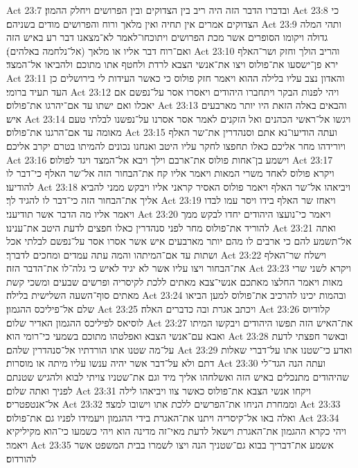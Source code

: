 Act 23:7  ובדברו הדבר הזה היה ריב בין הצדוקים ובין הפרושים ויחלק ההמון׃
Act 23:8  כי הצדוקים אמרים אין תחיה ואין מלאך ורוח והפרושים מודים בשניהם׃
Act 23:9  ותהי המלה גדולה ויקומו הסופרים אשר מכת הפרושים ויתוכחו־לאמר לא־מצאנו דבר רע באיש הזה ואם־רוח דבר אליו או מלאך (אל־נלחמה באלהים)׃
Act 23:10  והריב הולך וחזק ושר־האלף ירא פן־ישסעו את־פולוס ויצו את־אנשי הצבא לרדת ולחטף אתו מתוכם ולהביאו אל־המצד׃
Act 23:11  והאדון נצב עליו בלילה ההוא ויאמר חזק פולוס כי כאשר העידות לי בירושלים כן העד תעיד ברומי׃
Act 23:12  ויהי לפנות הבקר ויתחברו היהודים ויאסרו אסר על־נפשם אם יאכלו ואם ישתו עד אם־יהרגו את־פולוס׃
Act 23:13  והבאים באלה הזאת היו יותר מארבעים איש׃
Act 23:14  ויגשו אל־ראשי הכהנים ואל הזקנים לאמר אסר אסרנו על־נפשנו לבלתי טעם מאומה עד אם־הרגנו את־פולוס׃
Act 23:15  ועתה הודיעו־נא אתם וסנהדרין את־שר האלף ויורידהו מחר אליכם כאלו תחפצו לחקר עליו היטב ואנחנו נכונים להמיתו בטרם יקרב אליכם׃
Act 23:16  וישמע בן־אחות פולוס את־ארבם וילך ויבא אל־המצד ויגד לפולוס׃
Act 23:17  ויקרא פולוס לאחד משרי המאות ויאמר אליו קח את־הבחור הזה אל־שר האלף כי־דבר לו להודיעו׃
Act 23:18  ויביאהו אל־שר האלף ויאמר פולוס האסיר קראני אליו ויבקש ממני להביא אליך את־הבחור הזה כי־דבר לו להגיד לך׃
Act 23:19  ויאחז שר האלף בידו ויסר עמו לבדו ויאמר אליו מה הדבר אשר תודיעני׃
Act 23:20  ויאמר כי־נועצו היהודים יחדו לבקש ממך להוריד את־פולוס מחר לפני סנהדרין כאלו חפצים לדעת היטב את־ענינו׃
Act 23:21  ואתה אל־תשמע להם כי ארבים לו מהם יותר מארבעים איש אשר אסרו אסר על־נפשם לבלתי אכל ושתות עד אם־המיתהו והמה עתה עמדים ומחכים לדברך׃
Act 23:22  וישלח שר־האלף את־הבחור ויצו עליו אשר לא יגיד לאיש כי גלה־לו את־הדבר הזה׃
Act 23:23  ויקרא לשני שרי מאות ויאמר החלצו מאתכם אנשי־צבא מאתים ללכת לקיסריה ופרשים שבעים ומשכי קשת מאתים סוף־השעה השלישית בלילה׃
Act 23:24  ובהמות יכינו להרכיב את־פולוס למען הביאו שלם אל־פיליכס ההגמון׃
Act 23:25  ויכתב אגרת ובה כדברים האלה׃
Act 23:26  קלודיוס לוסיאס לפיליכס ההגמון האדיר שלום׃
Act 23:27  את־האיש הזה תפשו היהודים ויבקשו המיתו ואבא עם־אנשי הצבא ואפלטהו מתוכם בשמעי כי־רומי הוא׃
Act 23:28  ובאשר חפצתי לדעת על־מה שטנו אתו הורדתיו אל־סנהדרין שלהם׃
Act 23:29  ואדע כי־שטנו אתו על־דברי שאלות דתם ולא על־דבר אשר יהיה ענשו עליו מיתה או מוסרות׃
Act 23:30  ועתה הנה הגד־לי שהיהודים מתנכלים באיש הזה ואשלחהו אליך מיד וגם את־שטניו צויתי לבוא ולהגיש שטנתם לפניך ואתה שלום׃
Act 23:31  ויקחו אנשי הצבא את־פולוס כאשר צוו ויביאהו לילה אל־אנטפטריס׃
Act 23:32  וממחרת הניחו את־הפרשים ללכת אתו וישובו למצד׃
Act 23:33  ואלה באו אל־קיסריה ויתנו את־האגרת בידי ההגמון ויעמידו לפניו גם את־פולוס׃
Act 23:34  ויהי כקרא ההגמון את־האגרת וישאל לדעת מאי־זה מדינה הוא ויהי כשמעו כי־הוא מקיליקיא ויאמר׃
Act 23:35  אשמע את־דבריך בבוא גם־שטניך הנה ויצו לשמרו בבית המשפט אשר להורדוס׃
